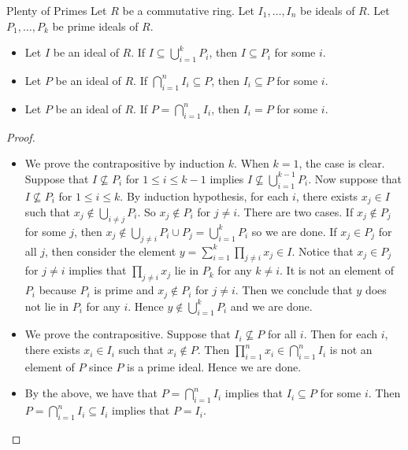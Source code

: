 \documentclass[a4paper]{article}
\begin{document}
\begin{prp}{Plenty of Primes}{} Let $R$ be a commutative ring. Let $I_1,\dots,I_n$ be ideals of $R$. Let $P_1,\dots,P_k$ be prime ideals of $R$. 
\begin{itemize}
\item Let $I$ be an ideal of $R$. If $I\subseteq\bigcup_{i=1}^kP_i$, then $I\subseteq P_i$ for some $i$. 
\item Let $P$ be an ideal of $R$. If $\bigcap_{i=1}^nI_i\subseteq P$, then $I_i\subseteq P$ for some $i$. 
\item Let $P$ be an ideal of $R$. If $P=\bigcap_{i=1}^nI_i$, then $I_i=P$ for some $i$. 
\end{itemize} \tcbline
\begin{proof}~\\
\begin{itemize}
\item We prove the contrapositive by induction $k$. When $k=1$, the case is clear. Suppose that $I\not\subseteq P_i$ for $1\leq i\leq k-1$ implies $I\not\subseteq\bigcup_{i=1}^{k-1}P_i$. Now suppose that $I\not\subseteq P_i$ for $1\leq i\leq k$. By induction hypothesis, for each $i$, there exists $x_j\in I$ such that $x_j\notin\bigcup_{i\neq j}P_i$. So $x_j\notin P_i$ for $j\neq i$. There are two cases. If $x_j\notin P_j$ for some $j$, then $x_j\notin\bigcup_{j\neq i}P_i\cup P_j=\bigcup_{i=1}^kP_i$ so we are done. If $x_j\in P_j$ for all $j$, then consider the element $y=\sum_{i=1}^k\prod_{j\neq i}x_j\in I$. Notice that $x_j\in P_j$ for $j\neq i$ implies that $\prod_{j\neq i}x_j$ lie in $P_k$ for any $k\neq i$. It is not an element of $P_i$ because $P_i$ is prime and $x_j\notin P_i$ for $j\neq i$. Then we conclude that $y$ does not lie in $P_i$ for any $i$. Hence $y\notin\bigcup_{i=1}^kP_i$ and we are done. 
\item We prove the contrapositive. Suppose that $I_i\not\subseteq P$ for all $i$. Then for each $i$, there exists $x_i\in I_i$ such that $x_i\notin P$. Then $\prod_{i=1}^nx_i\in\bigcap_{i=1}^nI_i$ is not an element of $P$ since $P$ is a prime ideal. Hence we are done. 
\item By the above, we have that $P=\bigcap_{i=1}^nI_i$ implies that $I_i\subseteq P$ for some $i$. Then $P=\bigcap_{i=1}^nI_i\subseteq I_i$ implies that $P=I_i$. 
\end{itemize}
\end{proof}
\end{prp}
\end{document}
